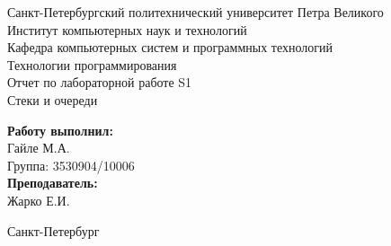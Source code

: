 \begin{titlepage}

  \begin{center}

    \large Санкт-Петербургский политехнический университет Петра Великого\\
    \large Институт компьютерных наук и технологий \\
    \large Кафедра компьютерных систем и программных технологий\\[6cm]
    
    \huge  Технологии программирования\\[0.5cm]
    \large Отчет по лабораторной работе S1\\[0.1cm]
    \large Стеки и очереди\\[5cm]

  \end{center}


  \begin{flushright}
    \begin{minipage}{0.25\textwidth}
      \begin{flushleft}

        \large\textbf{Работу выполнил:}\\
        \large Гайле М.А.\\
        \large {Группа:} 3530904/10006\\
        
        \large \textbf{Преподаватель:}\\
        \large Жарко Е.И.

      \end{flushleft}
    \end{minipage}
  \end{flushright}
  
  \vfill

  \begin{center}
  \large Санкт-Петербург\\
  \large \the\year
  \end{center}
\end{titlepage}
\vfill
